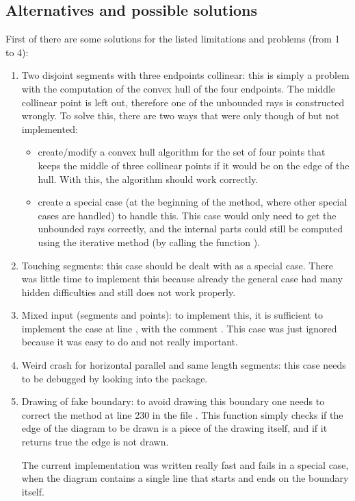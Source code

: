 \documentclass[11pt,a4paper,english]{article}
\begin{document}
	\subsection{Alternatives and possible solutions}
	First of there are some solutions for the listed limitations and problems (from 1 to 4):
	\begin{enumerate}
	\item Two disjoint segments with three endpoints collinear: this is simply a problem with the computation of the convex hull of the four endpoints. The middle collinear point is left out, therefore one of the unbounded rays is constructed wrongly. To solve this, there are two ways that were only though of but not implemented:
	\begin{itemize}[label=\(\triangleright\)]\setlength{\itemsep}{-2pt}
		\item create/modify a convex hull algorithm for the set of four points that keeps the middle of three collinear points if it would be on the edge of the hull. With this, the algorithm should work correctly.
		\item create a special case (at the beginning of the method, where other special cases are handled) to handle this. This case would only need to get the unbounded rays correctly, and the internal parts could still be computed using the iterative method (by calling the function ).
	\end{itemize}
	\item Touching segments: this case should be dealt with as a special case. There was little time to implement this because already the general case had many hidden difficulties and still does not work properly.
	\item Mixed input (segments and points): to implement this, it is sufficient to implement the case at line , with the comment . This case was just ignored because it was easy to do and not really important.
	\item Weird crash for horizontal parallel and same length segments: this case needs to be debugged by looking into the  package.
	\item Drawing of fake boundary: to avoid drawing this boundary one needs to correct the method  at line 230 in the file . This function simply checks if the edge of the diagram to be drawn is a piece of the drawing itself, and if it returns true the edge is not drawn.\par
	The current implementation was written really fast and fails in a special case, when the diagram contains a single line that starts and ends on the boundary itself.
	\end{enumerate}
	
\end{document}
